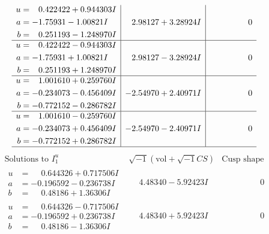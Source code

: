 \documentclass[1p]{elsarticle_modified}
\theoremstyle{definition}
\newcommand{\I}{\sqrt{-1}}
\begin{document}
$$\begin{array}{c|c|c}
\begin{aligned}
u &= \phantom{-}0.422422 + 0.944303 I \\
a &= -1.75931 - 1.00821 I \\
b &= \phantom{-}0.251193 - 1.248970 I\end{aligned}
 & \phantom{-}2.98127 + 3.28924 I & \phantom{-0.000000 } 0 \\ \hline\begin{aligned}
u &= \phantom{-}0.422422 - 0.944303 I \\
a &= -1.75931 + 1.00821 I \\
b &= \phantom{-}0.251193 + 1.248970 I\end{aligned}
 & \phantom{-}2.98127 - 3.28924 I & \phantom{-0.000000 } 0 \\ \hline\begin{aligned}
u &= \phantom{-}1.001610 + 0.259760 I \\
a &= -0.234073 - 0.456409 I \\
b &= -0.772152 - 0.286782 I\end{aligned}
 & -2.54970 + 2.40971 I & \phantom{-0.000000 } 0 \\ \hline\begin{aligned}
u &= \phantom{-}1.001610 - 0.259760 I \\
a &= -0.234073 + 0.456409 I \\
b &= -0.772152 + 0.286782 I\end{aligned}
 & -2.54970 - 2.40971 I & \phantom{-0.000000 } 0\\
 \hline 
 \end{array}$$\newpage$$\begin{array}{c|c|c}  
\text{Solutions to }I^u_{1}& \I (\text{vol} + \sqrt{-1}CS) & \text{Cusp shape}\\
 \hline 
\begin{aligned}
u &= \phantom{-}0.644326 + 0.717506 I \\
a &= -0.196592 - 0.236738 I \\
b &= \phantom{-}0.48186 + 1.36306 I\end{aligned}
 & \phantom{-}4.48340 - 5.92423 I & \phantom{-0.000000 } 0 \\ \hline\begin{aligned}
u &= \phantom{-}0.644326 - 0.717506 I \\
a &= -0.196592 + 0.236738 I \\
b &= \phantom{-}0.48186 - 1.36306 I\end{aligned}
 & \phantom{-}4.48340 + 5.92423 I & \phantom{-0.000000 } 0 \\ \hline\begin{aligned}

\end{aligned}
\end{array}$$
\end{document}
